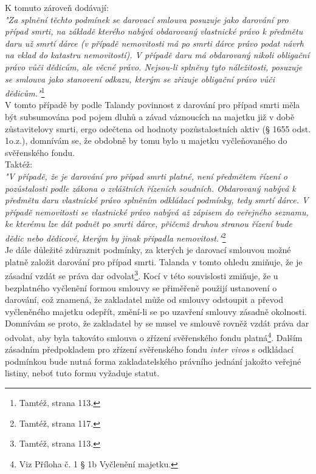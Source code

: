 \documentclass{article}
\begin{document}
K tomuto zároveň dodávají:\\

\textit{"Za splnění těchto podmínek se darovací smlouva posuzuje jako darování pro případ smrti, na základě kterého nabývá obdarovaný vlastnické právo k předmětu daru už smrtí dárce (v případě nemovitosti má po smrti dárce právo podat návrh na vklad do katastru nemovitostí). V případě daru má obdarovaný nikoli obligační právo vůči dědicům, ale věcné právo. Nejsou-li splněny tyto náležitosti, posuzuje se smlouva jako stanovení odkazu, kterým se zřizuje obligační právo vůči dědicům."}\footnote{Tamtéž, strana 113.}\\

V tomto případě by podle Talandy povinnost z darování pro případ smrti měla být subsumována pod pojem dluhů a závad váznoucích na majetku již v době zůstavitelovy smrti, ergo odečtena od hodnoty pozůstalostních aktiv (§ 1655 odst. 1o.z.), domnívám se, že obdobně by tomu bylo u majetku vyčleňovaného do svěřenského fondu.\\

Taktéž:\\

\textit{"V případě, že je darování pro případ smrti platné, není předmětem řízení o pozůstalosti podle zákona o zvláštních řízeních soudních. Obdarovaný nabývá k předmětu daru vlastnické právo splněním odkládací podmínky, tedy smrtí dárce. V případě nemovitosti se vlastnické právo nabývá až zápisem do veřejného seznamu, ke kterému lze dát podnět po smrti dárce, přičemž druhou stranou řízení bude dědic nebo dědicové, kterým by jinak připadla nemovitost."}\footnote{Tamtéž, strana 117.}\\

Je dále důležité zdůraznit podmínky, za kterých je darovací smlouvou možné platně založit darování pro případ smrti. Talanda v tomto ohledu zmiňuje, že je zásadní vzdát se práva dar odvolat\footnote{Tamtéž, strana 113.}. Kocí v této souvislosti zmiňuje, že u bezplatného vyčlenění formou smlouvy se přiměřeně použijí ustanovení o darování, což znamená, že zakladatel může od smlouvy odstoupit a převod vyčleněného majetku odepřít, změní-li se po uzavření smlouvy zásadně okolnosti. Domnívám se proto, že zakladatel by se musel ve smlouvě rovněž vzdát práva dar odvolat, aby byla takováto smlouva o zřízení svěřenského fondu platná\footnote{Viz Příloha č. 1 § 1b Vyčlenění majetku.}. Dalším zásadním předpokladem pro zřízení svěřenského fondu \textit{inter vivos} s odkládací podmínkou bude nutná forma zakladatelského právního jednání jakožto veřejné listiny, neboť tuto formu vyžaduje statut.\\ 
\end{document}
